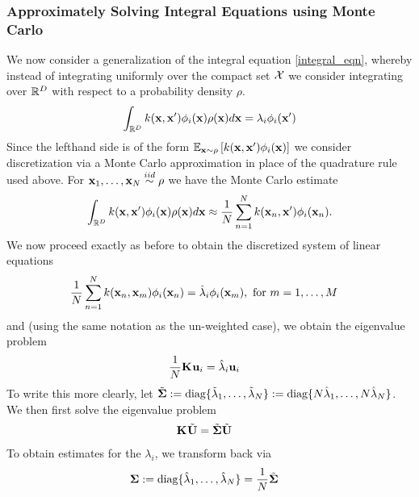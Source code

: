 \documentclass[12pt]{article}
\begin{document}
\subsubsection{Approximately Solving Integral Equations using Monte Carlo}
We now consider a generalization of the integral equation \ref{integral_eqn}, whereby instead of integrating uniformly over the compact set $\mathcal{X}$ we consider 
integrating over $\mathbb{R}^{D}$ with respect to a probability density $\rho$. 
\begin{align}
\int_{\mathbb{R}^{D}} k(\mathbf{x}, \mathbf{x}^\prime) \phi_i(\mathbf{x}) \rho(\mathbf{x}) d\mathbf{x} = \lambda_i \phi_i(\mathbf{x}^\prime) \label{integral_eqn_weighted}
\end{align}
Since the lefthand side is of the form $\mathbb{E}_{\mathbf{x} \sim \rho}\left[k(\mathbf{x}, \mathbf{x}^\prime) \phi_i(\mathbf{x}) \right]$ we consider discretization via a Monte Carlo approximation in place of the 
quadrature rule used above. For $\mathbf{x}_1, \dots, \mathbf{x}_{N} \overset{iid}{\sim} \rho$ we have the Monte Carlo estimate
\begin{align}
\int_{\mathbb{R}^{D}} k(\mathbf{x}, \mathbf{x}^\prime) \phi_i(\mathbf{x}) \rho(\mathbf{x}) d\mathbf{x} \approx \frac{1}{N} \sum_{n = 1}^{N} k(\mathbf{x}_{n}, \mathbf{x}^\prime) \phi_i(\mathbf{x}_{n}).
\end{align} 
We now proceed exactly as before to obtain the discretized system of linear equations
\begin{align}
\frac{1}{N} \sum_{n = 1}^{N} k(\mathbf{x}_{n}, \mathbf{x}_m) \phi_i(\mathbf{x}_{n}) &= \hat{\lambda}_i \phi_i(\mathbf{x}_{m}), \text{ for } m = 1, \dots, M
\end{align}
and (using the same notation as the un-weighted case), we obtain the eigenvalue problem 
\begin{align}
\frac{1}{N} \mathbf{K}_{} \mathbf{u}_i &= \hat{\lambda}_i \mathbf{u}_i
\end{align}
To write this more clearly, let $\tilde{\boldsymbol{\Sigma}} := \text{diag}\{\tilde{\lambda}_1, \dots, \tilde{\lambda}_{N}\} := \text{diag}\{N \hat{\lambda}_1, \dots, N \hat{\lambda}_{N}\}$. We then first solve the eigenvalue problem 
\begin{align}
\mathbf{K}_{} \tilde{\mathbf{U}} &= \tilde{\boldsymbol{\Sigma}} \tilde{\mathbf{U}}
\end{align}
To obtain estimates for the $\lambda_i$, we transform back via 
\begin{align}
\boldsymbol{\Sigma} &:= \text{diag}\{\hat{\lambda}_1, \dots, \hat{\lambda}_{N}\} = \frac{1}{N} \tilde{\boldsymbol{\Sigma}} 
\end{align}
\end{document}
